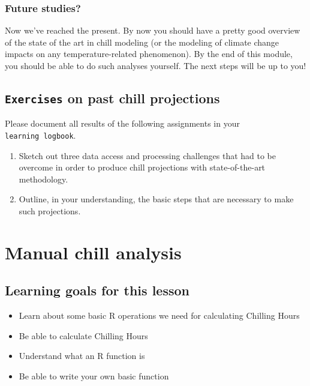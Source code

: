 \documentclass[
]{book}
\providecommand{\tightlist}{%
  \setlength{\itemsep}{0pt}\setlength{\parskip}{0pt}}
\begin{document}
\hypertarget{future-studies}{%
\subsection{Future studies?}\label{future-studies}}

Now we've reached the present. By now you should have a pretty good overview of the state of the art in chill modeling (or the modeling of climate change impacts on any temperature-related phenomenon). By the end of this module, you should be able to do such analyses yourself. The next steps will be up to you!

\hypertarget{exercises_past_studies}{%
\section*{\texorpdfstring{\texttt{Exercises} on past chill projections}{Exercises on past chill projections}}\label{exercises_past_studies}}

Please document all results of the following assignments in your \texttt{learning\ logbook}.

\begin{enumerate}
\def\labelenumi{\arabic{enumi})}
\item
  Sketch out three data access and processing challenges that had to be overcome in order to produce chill projections with state-of-the-art methodology.
\item
  Outline, in your understanding, the basic steps that are necessary to make such projections.
\end{enumerate}

\hypertarget{manual-chill-analysis}{%
\chapter{Manual chill analysis}\label{manual-chill-analysis}}

\hypertarget{goals_manual_chill_analysis}{%
\section*{Learning goals for this lesson}\label{goals_manual_chill_analysis}}

\begin{itemize}
\tightlist
\item
  Learn about some basic R operations we need for calculating Chilling Hours
\item
  Be able to calculate Chilling Hours
\item
  Understand what an R function is
\item
  Be able to write your own basic function
\end{itemize}
\end{document}
